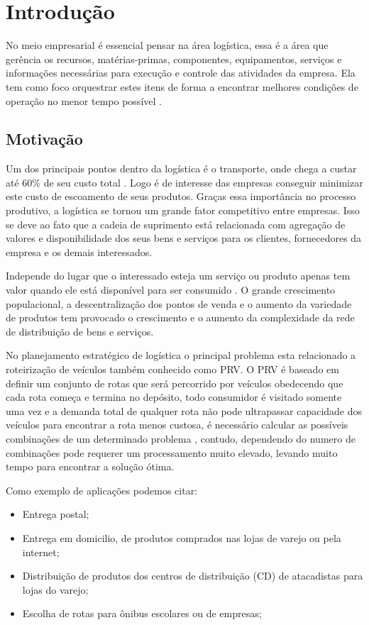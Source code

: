 \chapter[Introdução]{Introdução}

No meio empresarial é essencial pensar na área logística, essa é a área que gerência os recursos, matérias-primas, componentes, equipamentos, serviços e informações necessárias para execução e controle das atividades da empresa. 
Ela tem como foco orquestrar estes itens de forma a encontrar melhores condições de operação no menor tempo possível \cite{DIAS}.

\section{Motivação}

Um dos principais pontos dentro da logística é o transporte, onde chega a custar até 60\% de seu custo total \cite{RODRIGUES}.
Logo é de interesse das empresas conseguir minimizar este custo de escoamento de seus produtos. Graças essa importância no processo produtivo, a logística se tornou um grande fator competitivo entre empresas.
Isso se deve ao fato que a cadeia de suprimento está relacionada com agregação de valores e disponibilidade dos seus bens e serviços para os clientes, fornecedores da empresa e os demais interessados.

Independe do lugar que o interessado esteja um serviço ou produto apenas tem valor quando ele está disponível para ser consumido \cite{TSUDA}.
O grande crescimento populacional, a descentralização dos pontos de venda e o aumento da variedade de produtos tem provocado o crescimento e o aumento da complexidade da rede de distribuição de bens e serviços.

No planejamento estratégico de logística o principal problema esta relacionado a roteirização de veículos \cite{TSUDA} também conhecido como PRV\@.
O PRV é baseado em definir um conjunto de rotas que será percorrido por veículos obedecendo que cada rota começa e termina no depósito, todo consumidor é visitado somente uma vez e a demanda total de qualquer rota não pode ultrapassar capacidade dos veículos para encontrar a rota menos custosa, é necessário calcular as possíveis combinações de um determinado problema , contudo, dependendo do numero de combinações pode requerer um processamento muito elevado, levando muito tempo para encontrar a solução ótima.

Como exemplo de aplicações podemos citar:
\begin{itemize}
	\item Entrega postal;
	\item Entrega em domicilio, de produtos comprados nas lojas de varejo ou pela internet;
	\item Distribuição de produtos dos centros de distribuição (CD) de atacadistas para lojas do varejo;
	\item Escolha de rotas para ônibus escolares ou de empresas;
\end{itemize}

